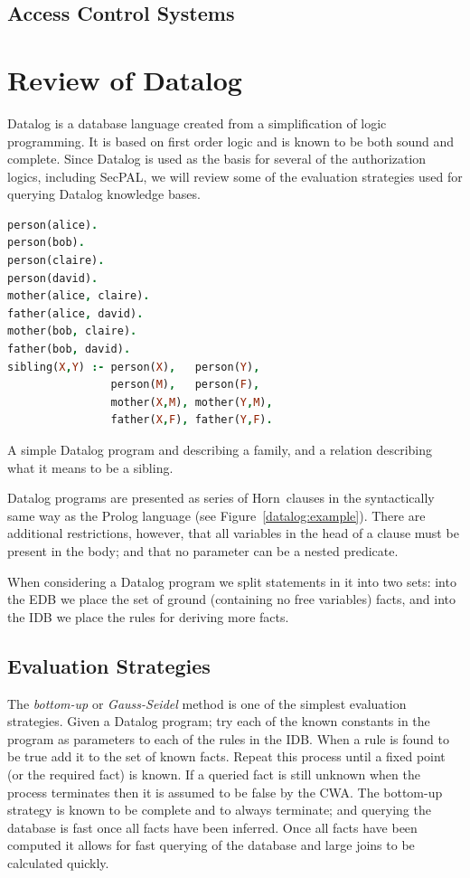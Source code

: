 \documentclass[a4paper]{article}
\begin{document}
\subsection{Access Control Systems}

\section{Review of Datalog}

Datalog is a database language created from a simplification of logic
programming.  It is based on first order logic and is known to be both sound and
complete.  Since Datalog is used as the basis for several of the authorization
logics, including SecPAL, we will review some of the evaluation strategies used
for querying Datalog knowledge bases.

\begin{marginfigure}
  \label{datalog:example}
  \begin{lstlisting}[language=Prolog]
person(alice).  
person(bob).
person(claire). 
person(david).
mother(alice, claire).
father(alice, david).
mother(bob, claire).
father(bob, david).
sibling(X,Y) :- person(X),   person(Y),
                person(M),   person(F),
                mother(X,M), mother(Y,M), 
                father(X,F), father(Y,F).
  \end{lstlisting}
  \caption{A simple Datalog program and describing a family, and a relation
  describing what it means to be a sibling.}
\end{marginfigure}

Datalog programs are presented as series of Horn~clauses in the syntactically
same way as the Prolog language (see Figure~\ref{datalog:example}).  There are
additional restrictions, however, that all variables in the head of a clause
must be present in the body; and that no parameter can be a nested predicate.

When considering a Datalog program we split statements in it into two sets: into
the \ac{EDB} we place the set of ground (containing no free variables) facts,
and into the \ac{IDB} we place the rules for deriving more facts.

\subsection{Evaluation Strategies}

The \emph{bottom-up} or \emph{Gauss-Seidel} method is one of the simplest
evaluation strategies\cite{Ceri:1989ff}.  Given a Datalog program; try each of
the known constants in the program as parameters to each of the rules in the
\ac{IDB}.  When a rule is found to be true add it to the set of known facts.
Repeat this process until a fixed point (or the required fact) is known.  If a
queried fact is still unknown when the process terminates then it is assumed to
be false by the \ac{CWA}.  The bottom-up strategy is known to be
complete and to always terminate; and querying the database is fast once all
facts have been inferred.  Once all facts have been computed it allows for fast
querying of the database and large joins to be calculated quickly.
\end{document}
